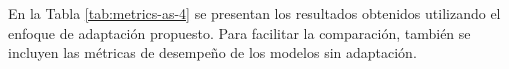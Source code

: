 \documentclass[letterpaper,12pt, twoside]{report}
\providecommand{\DIFdeltex}[1]{{\protect\color{red} \scriptsize #1}} %
\providecommand{\DIFdel}[1]{\texorpdfstring{\DIFdeltex{#1}}{}} %
\begin{document}

\DIFdel{En la Tabla \ref{tab:metrics-as-4} se presentan los resultados obtenidos utilizando el enfoque de adaptación propuesto. Para facilitar la comparación, también se incluyen las métricas de desempeño de los modelos sin adaptación.
}%
\end{document}
